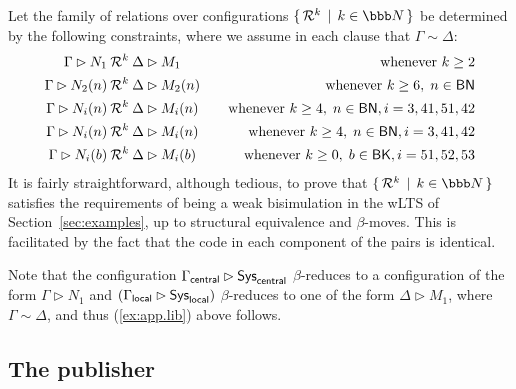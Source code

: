 \documentclass{LMCS}
\newcommand{\with}{\mathbin \rhd}
\newcommand{\nats}{\ensuremath{\bbb N}\xspace}
\newcommand{\setof}[2]{\{ \, #1 \, \mid \, #2 \, \}}\newcommand{\sset}[1]{\{ {#1}  \}  }
\newcommand{\calR}{\mathbin{\mathcal{R}}}
\begin{document}
Let the family of relations over configurations $\setof{\calR^k}{k \in \nats}$ be determined by the following
constraints, where we assume in each clause that $\Gamma \sim \Delta$:
\begin{align*}
  \Gamma \with N_1 &\calR^k  \Delta \with M_1  &&   &\text{whenever } k \geq 2\\
  \Gamma \with N_2(n) &\calR^k  \Delta \with M_2(n)  &&   &\text{whenever } k \geq 6,\; n \in \BookN \\
  \Gamma \with N_i(n) &\calR^k  \Delta \with M_i(n)  &&   &\text{whenever } k \geq 4,\; n \in \BookN, i = 3,41,51,42 \\
  \Gamma \with N_i(n) &\calR^k  \Delta \with M_i(n)  &&   &\text{whenever } k \geq 4,\; n \in \BookN, i = 3,41,42 \\
  \Gamma \with N_i(b) &\calR^k  \Delta \with M_i(b)  &&   &\text{whenever } k \geq 0,\; b \in \Books, i = 51,52,53 \\
\end{align*}
It is fairly straightforward, although tedious, to prove that
$\setof{\calR^k}{k \in \nats}$ satisfies the requirements of being  a weak
bisimulation in the wLTS of Section~\ref{sec:examples}, up to structural
equivalence and $\beta$-moves. This is facilitated by the fact that
the code in each component of the pairs is identical.

Note that the configuration 
\begin{math}
  \Gamma_{\central} \with \Sys_\central
\end{math}
$\beta$-reduces to a configuration of the form $\Gamma \with N_1$ and 
\begin{math}
  (\Gamma_{\local} \with \Sys_\local) 
\end{math}
$\beta$-reduces to one of the form $\Delta \with M_1$, where $\Gamma \sim \Delta$,  
and thus (\ref{ex:app.lib}) above follows. 

\subsection{The publisher}\label{sec:app.pub}
\end{document}
